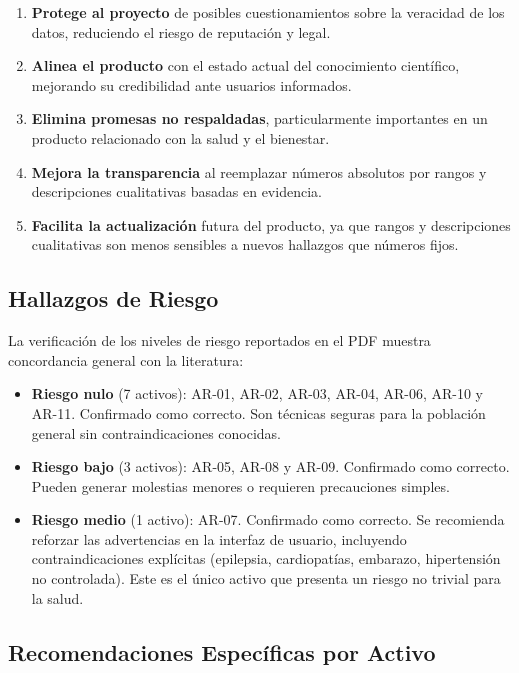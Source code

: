 \documentclass[12pt,a4paper]{article}
\begin{document}
\begin{enumerate}[itemsep=2pt]
    \item \textbf{Protege al proyecto} de posibles cuestionamientos sobre la
          veracidad de los datos, reduciendo el riesgo de reputación y legal.
    \item \textbf{Alinea el producto} con el estado actual del conocimiento
          científico, mejorando su credibilidad ante usuarios informados.
    \item \textbf{Elimina promesas no respaldadas}, particularmente importantes
          en un producto relacionado con la salud y el bienestar.
    \item \textbf{Mejora la transparencia} al reemplazar números absolutos por
          rangos y descripciones cualitativas basadas en evidencia.
    \item \textbf{Facilita la actualización} futura del producto, ya que rangos
          y descripciones cualitativas son menos sensibles a nuevos hallazgos
          que números fijos.
\end{enumerate}

\subsection{Hallazgos de Riesgo}

La verificación de los niveles de riesgo reportados en el PDF muestra
concordancia general con la literatura:

\begin{itemize}[itemsep=2pt]
    \item \textbf{Riesgo nulo} (7 activos): AR-01, AR-02, AR-03, AR-04, AR-06,
          AR-10 y AR-11. Confirmado como correcto. Son técnicas seguras para
          la población general sin contraindicaciones conocidas.
    \item \textbf{Riesgo bajo} (3 activos): AR-05, AR-08 y AR-09. Confirmado
          como correcto. Pueden generar molestias menores o requieren
          precauciones simples.
    \item \textbf{Riesgo medio} (1 activo): AR-07. Confirmado como correcto.
          Se recomienda reforzar las advertencias en la interfaz de usuario,
          incluyendo contraindicaciones explícitas (epilepsia, cardiopatías,
          embarazo, hipertensión no controlada). Este es el único activo que
          presenta un riesgo no trivial para la salud.
\end{itemize}

\subsection{Recomendaciones Específicas por Activo}
\end{document}
